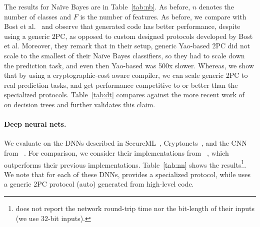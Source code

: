 
The results for Na\"{i}ve Bayes are
in Table~\ref{tab:nb}. As before, $n$ denotes the number of classes and $F$ is the number of features.
As before, we compare with Bost et al.~\cite{shafindss} and observe that \tool generated code
has better performance, despite using a generic 2PC,
as opposed to custom designed protocols developed by Bost et
al. Moreover, they remark that in their setup, generic Yao-based 2PC
did not scale to the smallest of their Na\"{i}ve Bayes classifiers, so
they had to scale down the prediction task, and even then Yao-based \mpc
was 500x slower. Whereas, we show that by using a
cryptographic-cost aware compiler, we can scale generic 2PC to real
prediction tasks, and get performance competitive to or better than the
specialized protocols. Table~\ref{tab:dt} 
compares against the more recent work of~\cite{wu}
on decision trees and further validates this claim.
\vspace{-0.2in}
\paragraph{Deep neural nets.}
We evaluate \tool on the DNNs described in SecureML~\cite{secureml},
Cryptonets~\cite{cryptonets}, and the CNN from \minion~\cite{minionn}. For
comparison, we consider their implementations from
\minion~\cite{minionn}, which outperforms their previous
implementations. Table~\ref{tab:nn} shows the
results\footnote{\minion does not report the network round-trip time nor the bit-length of their inputs (we use $32$-bit inputs).}.
We note that for each of these DNNs, \minion provides a
specialized protocol, while \tool uses a generic 2PC protocol
(auto) generated from high-level code.

